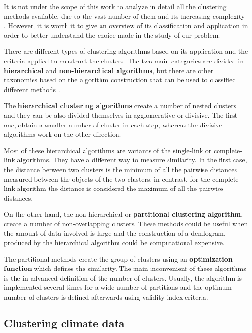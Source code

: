 It is not under the scope of this work to analyze in detail all the clustering methods available, due to the vast number of them and its increasing complexity \cite*{Jain1999}. However, it is worth it to give an overview of its classification and application in order to better understand the choice made in the study of our problem.

There are different types of clustering algorithms based on its application and the criteria applied to construct the clusters. The two main categories are divided in \textbf{hierarchical} and \textbf{non-hierarchical algorithms}, but there are other taxonomies based on the algorithm construction that can be used to classified different methods \cite*{Jain1999}.

The \textbf{hierarchical clustering algorithms} create a number of nested clusters and they can be also divided themselves in agglomerative or divisive. The first one, obtain a smaller number of cluster in each step, whereas the divisive algorithms work on the other direction.

Most of these hierarchical algorithms are variants of the single-link or complete-link algorithms. They have a different way to measure similarity. In the first case, the distance between two clusters is the minimum of all the pairwise distances measured between the objects of the two clusters, in contrast, for the complete-link algorithm the distance is considered the maximum of all the pairwise distances.

On the other hand, the non-hierarchical or \textbf{partitional clustering algorithm}, create a number of non-overlapping clusters. These methods could be useful when the amount of data involved is large and the construction of a dendogram, produced by the hierarchical algorithm could be computational expensive.

The partitional methods create the group of clusters using an \textbf{optimization function} which defines the similarity. The main inconvenient of these algorithms is the in-advanced definition of the number of clusters. Usually, the algorithm is implemented several times for a wide number of partitions and the optimum number of clusters is defined afterwards using validity index criteria.



\subsection{Clustering climate data}

